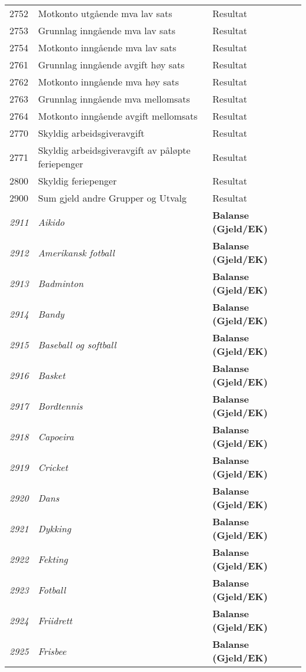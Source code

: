 \begin{longtable}{l l l}
2752 & Motkonto utgående mva lav sats & Resultat\\
2753 & Grunnlag inngående mva lav sats & Resultat\\
2754 & Motkonto inngående mva lav sats & Resultat\\
2761 & Grunnlag inngående avgift høy sats & Resultat\\
2762 & Motkonto inngående mva høy sats & Resultat\\
2763 & Grunnlag inngående mva mellomsats & Resultat\\
2764 & Motkonto inngående avgift mellomsats & Resultat\\
2770 & Skyldig arbeidsgiveravgift & Resultat\\
2771 & Skyldig arbeidsgiveravgift av påløpte feriepenger & Resultat\\
2800 & Skyldig feriepenger & Resultat\\
2900 & Sum gjeld andre Grupper og Utvalg & Resultat\\
\emph{2911} & \emph{Aikido} & {\bfseries Balanse (Gjeld/EK)}\\
\emph{2912} & \emph{Amerikansk fotball} & {\bfseries Balanse (Gjeld/EK)}\\
\emph{2913} & \emph{Badminton} & {\bfseries Balanse (Gjeld/EK)}\\
\emph{2914} & \emph{Bandy} & {\bfseries Balanse (Gjeld/EK)}\\
\emph{2915} & \emph{Baseball og softball} & {\bfseries Balanse (Gjeld/EK)}\\
\emph{2916} & \emph{Basket} & {\bfseries Balanse (Gjeld/EK)}\\
\emph{2917} & \emph{Bordtennis} & {\bfseries Balanse (Gjeld/EK)}\\
\emph{2918} & \emph{Capoeira} & {\bfseries Balanse (Gjeld/EK)}\\
\emph{2919} & \emph{Cricket} & {\bfseries Balanse (Gjeld/EK)}\\
\emph{2920} & \emph{Dans} & {\bfseries Balanse (Gjeld/EK)}\\
\emph{2921} & \emph{Dykking} & {\bfseries Balanse (Gjeld/EK)}\\
\emph{2922} & \emph{Fekting} & {\bfseries Balanse (Gjeld/EK)}\\
\emph{2923} & \emph{Fotball} & {\bfseries Balanse (Gjeld/EK)}\\
\emph{2924} & \emph{Friidrett} & {\bfseries Balanse (Gjeld/EK)}\\
\emph{2925} & \emph{Frisbee} & {\bfseries Balanse (Gjeld/EK)}\\

\end{longtable}
